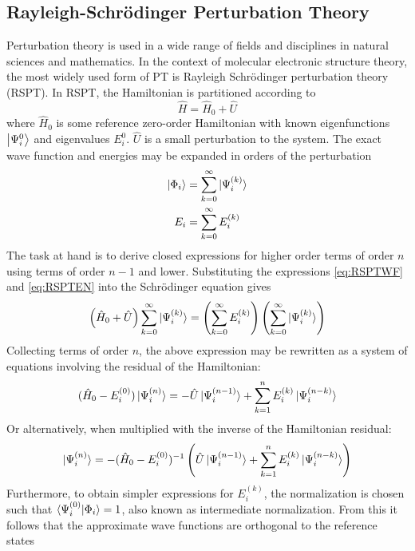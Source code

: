 \subsection{Rayleigh-Schrödinger Perturbation Theory}

Perturbation theory is used in a wide range of fields and disciplines in natural sciences and mathematics. In the context of molecular electronic structure theory, the most widely used form of PT is Rayleigh Schrödinger perturbation theory (RSPT). In RSPT, the Hamiltonian is partitioned according to
\begin{equation}
\hat{H} = \hat{H}_0 + \hat{U}
\end{equation}
\noindent where $\hat{H}_0$ is some reference zero-order Hamiltonian with known eigenfunctions $\ket{\Psi^{0}_i}$ and eigenvalues $E_i^{0}$. $\hat{U}$ is a small perturbation to the system. The exact wave function and energies may be expanded in orders of the perturbation
\begin{align}
\ket{\Phi_i} &= \sum_{k=0}^{\infty} \ket{\smash{\Psi_i^{(k)}}} \label{eq:RSPTWF} \\
E_i &= \sum_{k=0}^{\infty} E_i^{(k)} \label{eq:RSPTEN}
\end{align} 
\noindent The task at hand is to derive closed expressions for higher order terms of order $n$ using terms of order $n-1$ and lower. Substituting the expressions \ref{eq:RSPTWF} and \ref{eq:RSPTEN} into the Schrödinger equation gives
\begin{equation}
\left(\hat{H}_0 + \hat{U}\right) \sum_{k=0}^{\infty} \ket{\smash{\Psi_i^{(k)}}} = \left( \sum_{k=0}^{\infty} E_i^{(k)} \right) \left( \sum_{k=0}^{\infty} \ket{\smash{\Psi_i^{(k)}}} \right)
\label{eq:RSPTSEQ}
\end{equation}
\noindent Collecting terms of order $n$, the above expression may be rewritten as a system of equations involving the residual of the Hamiltonian:
\begin{equation}
(\hat{H}_0 - E_i^{(0)}) \ket{\smash{\Psi_i^{(n)}}} = -\hat{U} \ket{\smash{\Psi_i^{(n-1)}}} + \sum_{k=1}^{n} E_i^{(k)} \ket{\smash{\Psi_i^{(n-k)}}}
\label{eq:RSPTSEQ2}
\end{equation}
\noindent Or alternatively, when multiplied with the inverse of the Hamiltonian residual:
\begin{equation}
 \ket{\smash{\Psi_i^{(n)}}} = - (\hat{H}_0 - E_i^{(0)})^{-1} \left( \hat{U} \ket{\smash{\Psi_i^{(n-1)}}} + \sum_{k=1}^{n} E_i^{(k)} \ket{\smash{\Psi_i^{(n-k)}}} \right)
\label{eq:RSPTSWF}
\end{equation}
\noindent Furthermore, to obtain simpler expressions for $E_i^{(k)}$, the normalization is chosen such that $\bra{\smash{\Psi_i^{(0)}}}\ket{\smash{\Phi_i}}=1$, also known as intermediate normalization. From this it follows that the approximate wave functions are orthogonal to the reference states
